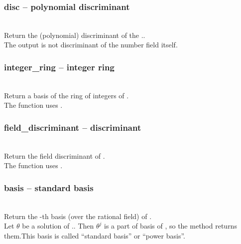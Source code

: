   \subsubsection{disc -- polynomial discriminant}
  \\
  \spacing
  \quad Return the (polynomial) discriminant of the .. \\
  \spacing
  \quad \negok The output is not discriminant of the number field itself. \\
%
  \subsubsection{integer\_ring -- integer ring}
  \\
  \spacing
  \quad Return a basis of the ring of integers of . \\
  \spacing
  \quad \negok The function uses .\\
%
  \subsubsection{field\_discriminant -- discriminant}
  \\
  \spacing
  \quad Return the field discriminant of . \\
  \spacing
  \quad \negok The function uses .\\
%
  \subsubsection{basis -- standard basis}
  \\
  \spacing
  \quad Return the -th basis (over the rational field) of . \\
  \spacing
  \quad Let $\theta$ be a solution of ..
  Then $\theta^j$ is a part of basis of , so the method returns them.This basis is called ``standard basis'' or ``power basis''.\\
%
